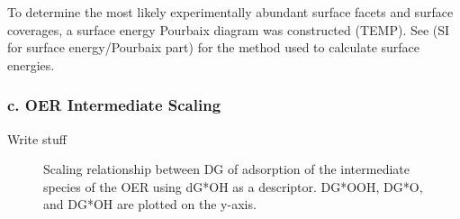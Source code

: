 To determine the most likely experimentally abundant surface facets and surface coverages, a surface energy Pourbaix diagram was constructed (TEMP).  %
See (SI for surface energy/Pourbaix part) for the method used to calculate surface energies.

\subsubsection{c. OER Intermediate Scaling}

Write stuff

\begin{figure}
\centering
{}
\caption{\label{fig:scaling_relations}
Scaling relationship between DG of adsorption of the intermediate species of the OER using dG*OH as a descriptor.
DG*OOH, DG*O, and DG*OH are plotted on the y-axis.
}
\end{figure}

